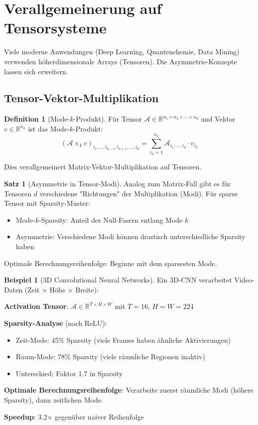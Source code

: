 \documentclass[a4paper,12pt]{report}
\theoremstyle{definition}
\newtheorem{definition}{Definition}
\newtheorem{beispiel}{Beispiel}
\newtheorem{satz}{Satz}
\begin{document}
	\section{Verallgemeinerung auf Tensorsysteme}
	
	Viele moderne Anwendungen (Deep Learning, Quantenchemie, Data Mining) verwenden höherdimensionale Arrays (Tensoren). Die Asymmetrie-Konzepte lassen sich erweitern.
	
	\subsection{Tensor-Vektor-Multiplikation}
	
	\begin{definition}[Mode-$k$-Produkt]
		Für Tensor $\mathcal{A} \in \mathbb{R}^{n_1 \times n_2 \times \cdots \times n_d}$ und Vektor $v \in \mathbb{R}^{n_k}$ ist das Mode-$k$-Produkt:
		\[
		(\mathcal{A} \times_k v)_{i_1, \ldots, i_{k-1}, i_{k+1}, \ldots, i_d} = \sum_{i_k=1}^{n_k} \mathcal{A}_{i_1, \ldots, i_d} \cdot v_{i_k}
		\]
		
		Dies verallgemeinert Matrix-Vektor-Multiplikation auf Tensoren.
	\end{definition}
	
	\begin{satz}[Asymmetrie in Tensor-Modi]
		Analog zum Matrix-Fall gibt es für Tensoren $d$ verschiedene "Richtungen" der Multiplikation (Modi). Für sparse Tensor mit Sparsity-Muster:
		\begin{itemize}
			\item Mode-$k$-Sparsity: Anteil der Null-Fasern entlang Mode $k$
			\item Asymmetrie: Verschiedene Modi können drastisch unterschiedliche Sparsity haben
		\end{itemize}
		
		Optimale Berechnungsreihenfolge: Beginne mit dem sparsesten Mode.
	\end{satz}
	
	\begin{beispiel}[3D Convolutional Neural Networks]
		Ein 3D-CNN verarbeitet Video-Daten (Zeit $\times$ Höhe $\times$ Breite):
		
		\textbf{Activation Tensor}: $\mathcal{A} \in \mathbb{R}^{T \times H \times W}$ mit $T=16$, $H=W=224$
		
		\textbf{Sparsity-Analyse} (nach ReLU):
		\begin{itemize}
			\item Zeit-Mode: 45\% Sparsity (viele Frames haben ähnliche Aktivierungen)
			\item Raum-Mode: 78\% Sparsity (viele räumliche Regionen inaktiv)
			\item Unterschied: Faktor 1.7 in Sparsity
		\end{itemize}
		
		\textbf{Optimale Berechnungsreihenfolge}:
		Verarbeite zuerst räumliche Modi (höhere Sparsity), dann zeitlichen Mode.
		
		\textbf{Speedup}: 3.2$\times$ gegenüber naiver Reihenfolge
	\end{beispiel}
	
\end{document}
